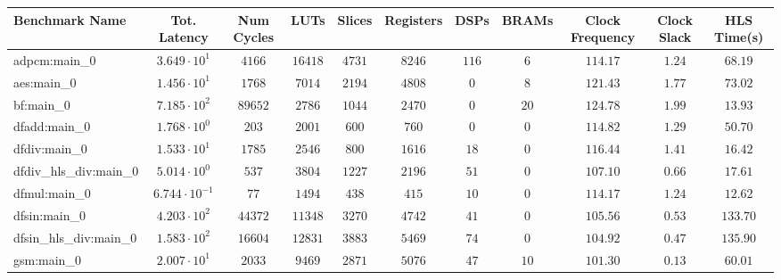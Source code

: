\begin{tabular}{|l|c|c|c|c|c|c|c|c|c|c|}
\hline
Benchmark Name          & Tot. Latency            & Num Cycles & LUTs       & Slices    & Registers & DSPs    & BRAMs   & Clock Frequency & Clock Slack & HLS Time(s) \\
\hline
adpcm:main\_0           & $ 3.649 \cdot 10^{1}  $ & $ 4166   $ & $ 16418  $ & $ 4731  $ & $ 8246  $ & $ 116 $ & $ 6   $ & $ 114.17      $ & $ 1.24    $ & $ 68.19   $ \\
aes:main\_0             & $ 1.456 \cdot 10^{1}  $ & $ 1768   $ & $ 7014   $ & $ 2194  $ & $ 4808  $ & $ 0   $ & $ 8   $ & $ 121.43      $ & $ 1.77    $ & $ 73.02   $ \\
bf:main\_0              & $ 7.185 \cdot 10^{2}  $ & $ 89652  $ & $ 2786   $ & $ 1044  $ & $ 2470  $ & $ 0   $ & $ 20  $ & $ 124.78      $ & $ 1.99    $ & $ 13.93   $ \\
dfadd:main\_0           & $ 1.768 \cdot 10^{0}  $ & $ 203    $ & $ 2001   $ & $ 600   $ & $ 760   $ & $ 0   $ & $ 0   $ & $ 114.82      $ & $ 1.29    $ & $ 50.70   $ \\
dfdiv:main\_0           & $ 1.533 \cdot 10^{1}  $ & $ 1785   $ & $ 2546   $ & $ 800   $ & $ 1616  $ & $ 18  $ & $ 0   $ & $ 116.44      $ & $ 1.41    $ & $ 16.42   $ \\
dfdiv\_hls\_div:main\_0 & $ 5.014 \cdot 10^{0}  $ & $ 537    $ & $ 3804   $ & $ 1227  $ & $ 2196  $ & $ 51  $ & $ 0   $ & $ 107.10      $ & $ 0.66    $ & $ 17.61   $ \\
dfmul:main\_0           & $ 6.744 \cdot 10^{-1} $ & $ 77     $ & $ 1494   $ & $ 438   $ & $ 415   $ & $ 10  $ & $ 0   $ & $ 114.17      $ & $ 1.24    $ & $ 12.62   $ \\
dfsin:main\_0           & $ 4.203 \cdot 10^{2}  $ & $ 44372  $ & $ 11348  $ & $ 3270  $ & $ 4742  $ & $ 41  $ & $ 0   $ & $ 105.56      $ & $ 0.53    $ & $ 133.70  $ \\
dfsin\_hls\_div:main\_0 & $ 1.583 \cdot 10^{2}  $ & $ 16604  $ & $ 12831  $ & $ 3883  $ & $ 5469  $ & $ 74  $ & $ 0   $ & $ 104.92      $ & $ 0.47    $ & $ 135.90  $ \\
gsm:main\_0             & $ 2.007 \cdot 10^{1}  $ & $ 2033   $ & $ 9469   $ & $ 2871  $ & $ 5076  $ & $ 47  $ & $ 10  $ & $ 101.30      $ & $ 0.13    $ & $ 60.01   $ \\

\end{tabular}
